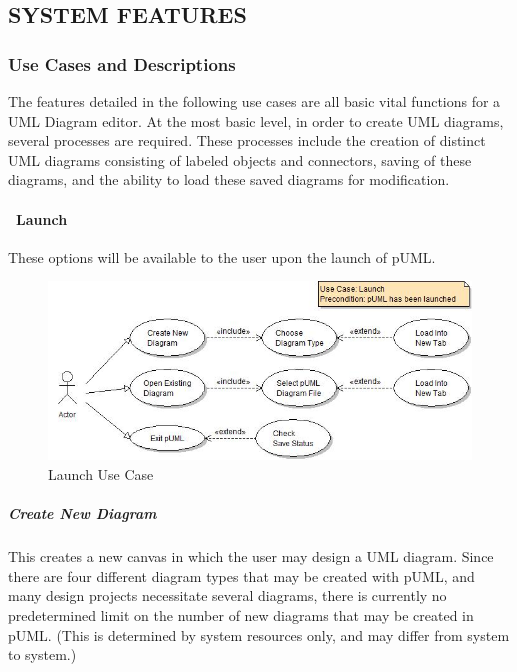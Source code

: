 \documentclass[twoside,letterpaper]{article}
\begin{document}
\clearpage\setcounter{page}{1}\pagestyle{Convertv}

\subsection[SYSTEM FEATURES]{\bfseries
SYSTEM FEATURES}


\subsubsection{Use Cases and Descriptions}
{
The features detailed in the following use cases are all basic vital functions for a UML Diagram editor. At the most basic level, in order to create UML diagrams, several processes are required. These processes include the creation of distinct UML diagrams consisting of labeled objects and connectors, saving of these diagrams, and the ability to load these saved diagrams for modification.
}

\bigskip

\paragraph[\ Launch ]
{\ Launch} {These options will be available to the user upon the launch of pUML.}

\begin{figure}[h]
\centering
\includegraphics[width=6.0in]{ucaseLaunch.jpg}
\caption{Launch Use Case}
\end{figure}

\subparagraph[\ Create New Diagram ] 
{\bfseries Create New Diagram }
{ This creates a new canvas in which the user may design a UML diagram. Since there are four different diagram types that may be created with pUML, and many design projects necessitate several diagrams, there is currently no predetermined limit on the number of new diagrams that may be created in pUML. (This is determined by system resources only, and may differ from system to system.) }
\end{document}
